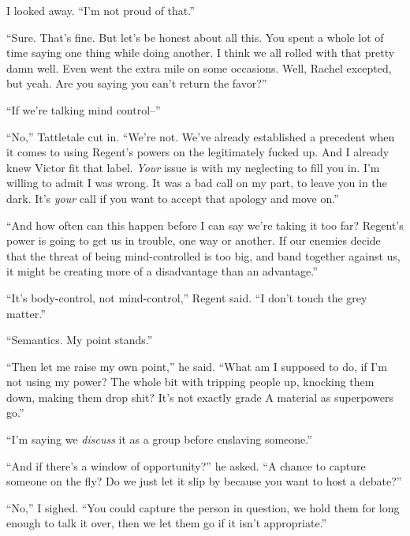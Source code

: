I looked away.  ``I'm not proud of that.''



``Sure.  That's fine.  But let's be honest about all this.  You spent a whole lot of time saying one thing while doing another.  I think we all rolled with that pretty damn well.  Even went the extra mile on some occasions.  Well, Rachel excepted, but yeah.  Are you saying you can't return the favor?''



``If we're talking mind control--''



``No,'' Tattletale cut in.  ``We're not.  We've already established a precedent when it comes to using Regent's powers on the legitimately fucked up.  And I already knew Victor fit that label.  \emph{Your} issue is with my neglecting to fill you in.  I'm willing to admit I was wrong.  It was a bad call on my part, to leave you in the dark.  It's \emph{your} call if you want to accept that apology and move on.''



``And how often can this happen before I can say we're taking it too far?  Regent's power is going to get us in trouble, one way or another.  If our enemies decide that the threat of being mind-controlled is too big, and band together against us, it might be creating more of a disadvantage than an advantage.''



``It's body-control, not mind-control,'' Regent said.  ``I don't touch the grey matter.''



``Semantics.  My point stands.''



``Then let me raise my own point,'' he said.  ``What am I supposed to do, if I'm not using my power?  The whole bit with tripping people up, knocking them down, making them drop shit?  It's not exactly grade A material as superpowers go.''



``I'm saying we \emph{discuss} it as a group before enslaving someone.''



``And if there's a window of opportunity?'' he asked.  ``A chance to capture someone on the fly?  Do we just let it slip by because you want to host a debate?''



``No,'' I sighed.  ``You could capture the person in question, we hold them for long enough to talk it over, then we let them go if it isn't appropriate.''



